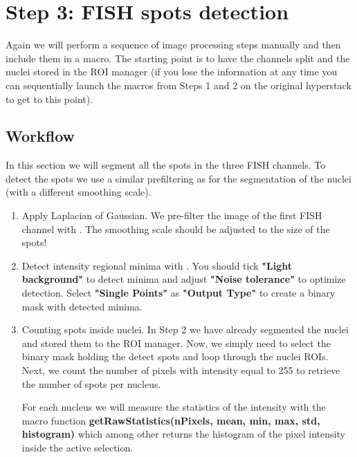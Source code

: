\section{Step 3: FISH spots detection}

Again we will perform a sequence of image processing steps manually and then include them in a macro. The starting point is to have the channels split and the nuclei stored in the ROI manager (if you lose the information at any time you can sequentially launch the macros from Steps 1 and 2 on the original hyperstack to get to this point).

\subsection{Workflow}
In this section we will segment all the spots in the three FISH channels. To detect the spots we use a similar prefiltering as for the segmentation of the nuclei (with a different smoothing scale).

\begin{enumerate}
    \item Apply Laplacian of Gaussian. We pre-filter the image of the first FISH channel with . The smoothing scale should be adjusted to the size of the spots!
\item Detect intensity regional minima with . You should tick \textbf{"Light background"} to detect minima and adjust \textbf{"Noise tolerance"} to optimize detection. Select \textbf{"Single Points"} as \textbf{"Output Type"} to create a binary mask with detected minima.
    
    \item Counting spots inside nuclei.
    In Step 2 we have already segmented the nuclei and stored them to the ROI manager. Now, we simply need to select the binary mask holding the detect spots and loop through the nuclei ROIs. Next, we count the number of pixels with intensity equal to 255 to retrieve the number of spots per nucleus.
    
    For each nucleus we will measure the statistics of the intensity with the macro function \textbf{getRawStatistics(nPixels, mean, min, max, std, histogram)} which among other returns the histogram of the pixel intensity inside the active selection.

\end{enumerate}